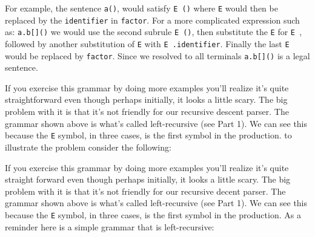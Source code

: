 For example, the sentence {\tt a()}, would satisfy {\tt E \textquotesingle()\textquotesingle} where {\tt E} would then be replaced by the {\tt identifier} in {\tt factor}. For a more complicated expression such as: {\tt a.b[]()} we would use the second subrule {\tt E \textquotesingle()\textquotesingle}, then substitute the {\tt E} for {\tt E \textquotesingle[]\textquotesingle}, followed by another substitution of {\tt E} with {\tt E \textquotesingle.\textquotesingle identifier}. Finally the last {\tt E} would be replaced by {\tt factor}. Since we resolved to all terminals {\tt a.b[]()} is a legal sentence.

If you exercise this grammar by doing more examples you'll realize it's quite straightforward even though perhaps initially, it looks a little scary.  The big problem with it is that it's not friendly for our recursive descent parser. The grammar shown above is what's called left-recursive (see Part 1). We can see this because the {\tt E} symbol, in three cases, is the first symbol in the production. to illustrate the problem consider the following:
%

If you exercise this grammar by doing more examples you'll realize it's quite straight forward even though perhaps initially, it looks a little scary.  The big problem with it is that it's not friendly for our recursive decent parser. The grammar shown above is what's called left-recursive (see Part 1). We can see this because the {\tt E} symbol, in three cases, is the first symbol in the production.  As a reminder here is a simple grammar that is left-recursive:

